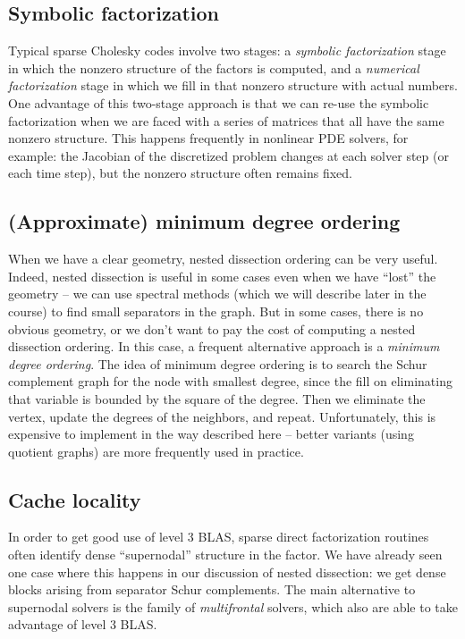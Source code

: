 \documentclass[12pt, leqno]{article} %
\begin{document}
\subsection{Symbolic factorization}

Typical sparse Cholesky codes involve two stages:
a {\em symbolic factorization} stage in which the nonzero structure
of the factors is computed, and a {\em numerical factorization} stage
in which we fill in that nonzero structure with actual numbers.  One
advantage of this two-stage approach is that we can re-use the
symbolic factorization when we are faced with a series of matrices
that all have the same nonzero structure.  This happens frequently in
nonlinear PDE solvers, for example: the Jacobian of the discretized
problem changes at each solver step (or each time step), but the
nonzero structure often remains fixed.

\subsection{(Approximate) minimum degree ordering}

When we have a clear geometry, nested dissection ordering can be very
useful.  Indeed, nested dissection is useful in some cases even when
we have ``lost'' the geometry -- we can use spectral methods (which we
will describe later in the course) to find small separators in the
graph.  But in some cases, there is no obvious geometry, or we don't
want to pay the cost of computing a nested dissection ordering.  In
this case, a frequent alternative approach is a {\em minimum degree
  ordering}.  The idea of minimum degree ordering is to search the
Schur complement graph for the node with smallest degree, since the
fill on eliminating that variable is bounded by the square of the
degree.  Then we eliminate the vertex, update the degrees of the
neighbors, and repeat.  Unfortunately, this is expensive to implement
in the way described here -- better variants (using quotient graphs)
are more frequently used in practice.

\subsection{Cache locality}

In order to get good use of level 3 BLAS, sparse direct factorization
routines often identify dense ``supernodal'' structure in the factor.
We have already seen one case where this happens in our discussion of
nested dissection: we get dense blocks arising from separator Schur
complements.  The main alternative to supernodal solvers is the family
of {\em multifrontal} solvers, which also are able to take advantage
of level 3 BLAS.
\end{document}
